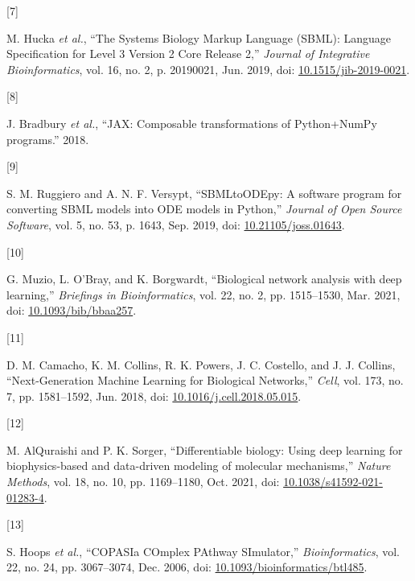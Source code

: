 \documentclass[
]{article}
\newlength{\cslhangindent}
\newlength{\csllabelwidth}
\newlength{\cslentryspacingunit} %
\newenvironment{CSLReferences}[2] %
 {%
  \setlength{\parindent}{0pt}
  \ifodd #1
  \let\oldpar\par
  \def\par{\hangindent=\cslhangindent\oldpar}
  \fi
  \setlength{\parskip}{#2\cslentryspacingunit}
 }%
 {}
\newcommand{\CSLLeftMargin}[1]{\parbox[t]{\csllabelwidth}{#1}}
\newcommand{\CSLRightInline}[1]{\parbox[t]{\linewidth - \csllabelwidth}{#1}\break}
\begin{document}
\begin{CSLReferences}{0}{0}
\leavevmode{}%
\CSLLeftMargin{{[}7{]} }%
\CSLRightInline{M. Hucka \emph{et al.}, {``The {Systems Biology Markup
Language} ({SBML}): {Language Specification} for {Level} 3 {Version} 2
{Core Release} 2,''} \emph{Journal of Integrative Bioinformatics}, vol.
16, no. 2, p. 20190021, Jun. 2019, doi:
\href{https://doi.org/10.1515/jib-2019-0021}{10.1515/jib-2019-0021}.}

\leavevmode{}%
\CSLLeftMargin{{[}8{]} }%
\CSLRightInline{J. Bradbury \emph{et al.}, {``{JAX}: Composable
transformations of {Python}+{NumPy} programs.''} 2018.}

\leavevmode{}%
\CSLLeftMargin{{[}9{]} }%
\CSLRightInline{S. M. Ruggiero and A. N. F. Versypt, {``{SBMLtoODEpy}:
{A} software program for converting {SBML} models into {ODE} models in
{Python},''} \emph{Journal of Open Source Software}, vol. 5, no. 53, p.
1643, Sep. 2019, doi:
\href{https://doi.org/10.21105/joss.01643}{10.21105/joss.01643}.}

\leavevmode{}%
\CSLLeftMargin{{[}10{]} }%
\CSLRightInline{G. Muzio, L. O'Bray, and K. Borgwardt, {``Biological
network analysis with deep learning,''} \emph{Briefings in
Bioinformatics}, vol. 22, no. 2, pp. 1515--1530, Mar. 2021, doi:
\href{https://doi.org/10.1093/bib/bbaa257}{10.1093/bib/bbaa257}.}

\leavevmode{}%
\CSLLeftMargin{{[}11{]} }%
\CSLRightInline{D. M. Camacho, K. M. Collins, R. K. Powers, J. C.
Costello, and J. J. Collins, {``Next-{Generation Machine Learning} for
{Biological Networks},''} \emph{Cell}, vol. 173, no. 7, pp. 1581--1592,
Jun. 2018, doi:
\href{https://doi.org/10.1016/j.cell.2018.05.015}{10.1016/j.cell.2018.05.015}.}

\leavevmode{}%
\CSLLeftMargin{{[}12{]} }%
\CSLRightInline{M. AlQuraishi and P. K. Sorger, {``Differentiable
biology: Using deep learning for biophysics-based and data-driven
modeling of molecular mechanisms,''} \emph{Nature Methods}, vol. 18, no.
10, pp. 1169--1180, Oct. 2021, doi:
\href{https://doi.org/10.1038/s41592-021-01283-4}{10.1038/s41592-021-01283-4}.}

\leavevmode{}%
\CSLLeftMargin{{[}13{]} }%
\CSLRightInline{S. Hoops \emph{et al.}, {``{COPASI}\textemdash a
{COmplex PAthway SImulator},''} \emph{Bioinformatics}, vol. 22, no. 24,
pp. 3067--3074, Dec. 2006, doi:
\href{https://doi.org/10.1093/bioinformatics/btl485}{10.1093/bioinformatics/btl485}.}


\end{CSLReferences}
\end{document}
